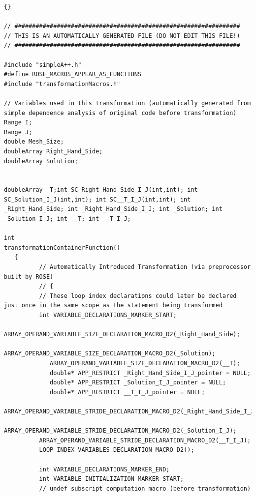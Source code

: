 \documentclass[10pt]{article}
\begin{document}
\begin{lstlisting}{}

// ################################################################
// THIS IS AN AUTOMATICALLY GENERATED FILE (DO NOT EDIT THIS FILE!)
// ################################################################

#include "simpleA++.h" 
#define ROSE_MACROS_APPEAR_AS_FUNCTIONS 
#include "transformationMacros.h" 

// Variables used in this transformation (automatically generated from simple dependence analysis of original code before transformation) 
Range I; 
Range J; 
double Mesh_Size; 
doubleArray Right_Hand_Side; 
doubleArray Solution; 


doubleArray _T;int SC_Right_Hand_Side_I_J(int,int); int SC_Solution_I_J(int,int); int SC__T_I_J(int,int); int _Right_Hand_Side; int _Right_Hand_Side_I_J; int _Solution; int _Solution_I_J; int __T; int __T_I_J; 

int
transformationContainerFunction() 
   {
          // Automatically Introduced Transformation (via preprocessor built by ROSE)
          // { 
          // These loop index declarations could later be declared just once in the same scope as the statement being transformed 
          int VARIABLE_DECLARATIONS_MARKER_START; 
             ARRAY_OPERAND_VARIABLE_SIZE_DECLARATION_MACRO_D2(_Right_Hand_Side);
             ARRAY_OPERAND_VARIABLE_SIZE_DECLARATION_MACRO_D2(_Solution);
             ARRAY_OPERAND_VARIABLE_SIZE_DECLARATION_MACRO_D2(__T);
             double* APP_RESTRICT _Right_Hand_Side_I_J_pointer = NULL;
             double* APP_RESTRICT _Solution_I_J_pointer = NULL;
             double* APP_RESTRICT __T_I_J_pointer = NULL;
          ARRAY_OPERAND_VARIABLE_STRIDE_DECLARATION_MACRO_D2(_Right_Hand_Side_I_J);
          ARRAY_OPERAND_VARIABLE_STRIDE_DECLARATION_MACRO_D2(_Solution_I_J);
          ARRAY_OPERAND_VARIABLE_STRIDE_DECLARATION_MACRO_D2(__T_I_J);
          LOOP_INDEX_VARIABLES_DECLARATION_MACRO_D2();
           
          int VARIABLE_DECLARATIONS_MARKER_END; 
          int VARIABLE_INITIALIZATION_MARKER_START; 
          // undef subscript computation macro (before transformation) 
           

\end{lstlisting}
\end{document}
